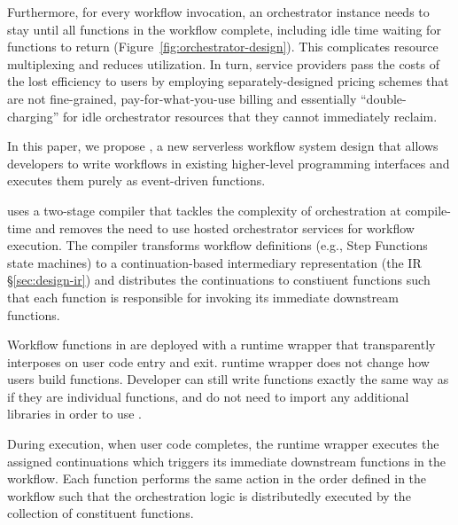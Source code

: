 Furthermore, for every workflow invocation, an orchestrator instance needs to
stay until all functions in the workflow complete, including idle time waiting
for functions to return (Figure~\ref{fig:orchestrator-design}). This
complicates resource multiplexing and reduces utilization. In turn, service
providers pass the costs of the lost efficiency to users by employing
separately-designed pricing schemes that are not fine-grained,
pay-for-what-you-use billing and essentially ``double-charging'' for idle
orchestrator resources that they cannot immediately reclaim.

In this paper, we propose \name{}, a new serverless workflow system design
that allows developers to write workflows in existing higher-level programming
interfaces and executes them purely as event-driven functions.

\name{} uses a two-stage compiler that tackles the complexity of orchestration
at compile-time and removes the need to use hosted orchestrator services for
workflow execution. The compiler transforms workflow definitions (e.g., Step
Functions state machines) to a continuation-based intermediary representation
(the \name{} IR \S\ref{sec:design-ir}) and distributes the continuations to
constiuent functions such that each function is responsible for invoking its
immediate downstream functions.

Workflow functions in \name{} are deployed with a runtime wrapper that
transparently interposes on user code entry and exit. \name{} runtime wrapper
does not change how users build functions. Developer can still write functions
exactly the same way as if they are individual functions, and do not need to
import any additional libraries in order to use \name{}.

During execution, when user code completes, the runtime wrapper executes the
assigned continuations which triggers its immediate downstream functions in
the workflow. Each function performs the same action in the order defined in
the workflow such that the orchestration logic is distributedly executed by
the collection of constituent functions.


